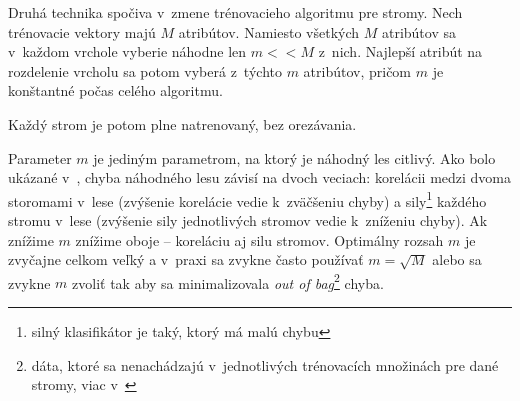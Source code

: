 Druhá technika spočiva v~zmene trénovacieho algoritmu pre stromy. Nech trénovacie vektory majú $M$ atribútov. Namiesto všetkých $M$ atribútov sa v~každom vrchole vyberie náhodne len $m<<M$ z~nich. Najlepší atribút na rozdelenie vrcholu sa potom vyberá z~týchto $m$ atribútov, pričom $m$ je konštantné počas celého algoritmu.

Každý strom je potom plne natrenovaný, bez orezávania.

Parameter $m$ je jediným parametrom, na ktorý je náhodný les citlivý. Ako bolo ukázané v~\cite{randomForestPaper}, chyba náhodného lesu závisí na dvoch veciach: korelácii medzi dvoma storomami v~lese (zvýšenie korelácie vedie k~zväčšeniu chyby) a sily\footnote{silný klasifikátor je taký, ktorý má malú chybu} každého stromu v~lese (zvýšenie sily jednotlivých stromov vedie k~zníženiu chyby). Ak znížime $m$ znížime oboje -- koreláciu aj silu stromov. Optimálny rozsah $m$ je zvyčajne celkom veľký a v~praxi sa zvykne často používať $m = \sqrt{M}$ alebo sa zvykne $m$ zvoliť tak aby sa minimalizovala \textit{out of bag}\footnote{dáta, ktoré sa nenachádzajú v~jednotlivých trénovacích množinách pre dané stromy, viac v~\cite{randomForest}} chyba.



